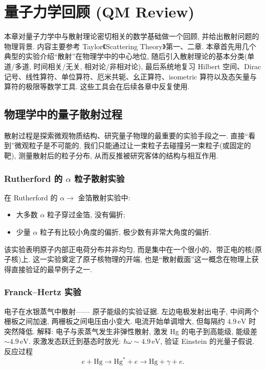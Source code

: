 \chapter{量子力学回顾 (QM Review)}\label{ch:qmreview}

本章对量子力学中与散射理论密切相关的数学基础做一个回顾, 并给出散射问题的物理背景. 内容主要参考 Taylor《Scattering Theory》第一、二章. 本章首先用几个典型的实验介绍``散射''在物理学中的中心地位, 随后引入散射理论的基本分类(单道/多道, 时间相关/无关, 相对论/非相对论), 最后系统地复习 Hilbert 空间、Dirac 记号、线性算符、单位算符、厄米共轭、幺正算符、isometric 算符以及态矢量与算符的极限等数学工具. 这些工具会在后续各章中反复使用.

\section{物理学中的量子散射过程}\label{sec:qm-scattering-physics}

散射过程是探索微观物质结构、研究量子物理的最重要的实验手段之一. 直接``看到''微观粒子是不可能的, 我们只能通过让一束粒子去碰撞另一束粒子(或固定的靶), 测量散射后的粒子分布, 从而反推被研究客体的结构与相互作用.

\subsection{Rutherford 的 \texorpdfstring{$\alpha$}{α} 粒子散射实验}

在 Rutherford 的 $\alpha\to$ 金箔散射实验中:
\begin{itemize}
    \item 大多数 $\alpha$ 粒子穿过金箔, 没有偏折;
    \item 少量 $\alpha$ 粒子有比较小角度的偏折, 极少数有非常大角度的偏折.
\end{itemize}
该实验表明原子内部正电荷分布并非均匀, 而是集中在一个很小的、带正电的核(原子核)上. 这一实验奠定了原子核物理的开端, 也是``散射截面''这一概念在物理上获得直接验证的最早例子之一.

\subsection{Franck--Hertz 实验}

电子在水银蒸气中散射—— 原子能级的实验证据. 左边电极发射出电子, 中间两个栅板之间加速, 两栅板之间电压由小变大. 电流开始单调增大, 但每隔约 $4.9\,\mathrm{eV}$ 时突然降低. 解释: 电子与汞蒸气发生非弹性散射, 激发 Hg 的电子到高能级, 能级差 $\sim 4.9\,\mathrm{eV}$. 汞激发态跃迁到基态时放光: $\hbar\omega\sim 4.9\,\mathrm{eV}$, 验证 Einstein 的光量子假说. 反应过程
\begin{equation}
e+\mathrm{Hg}\to \mathrm{Hg}^{*}+e\to \mathrm{Hg}+\gamma+e.
\end{equation}

